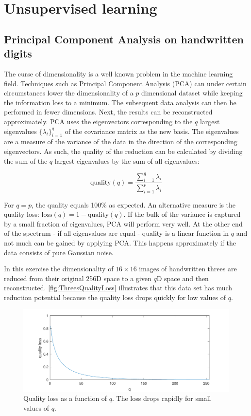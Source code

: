 \documentclass[a4, 10pt, twoside, twocolumn]{article}
\numberwithin{figure}{section}
\begin{document}
\section{Unsupervised learning}
\subsection{Principal Component Analysis on handwritten digits}
The curse of dimensionality is a well known problem in the machine learning field. Techniques such as Principal Component Analysis (PCA) can under certain circumstances lower the dimensionality of a $p$ dimensional dataset while keeping the information loss to a minimum. The subsequent data analysis can then be performed in fewer dimensions. Next, the results can be reconstructed approximately. PCA uses the eigenvectors corresponding to the $q$ largest eigenvalues $\{\lambda_i\}_{i=1}^q$ of the covariance matrix as the new basis. The eigenvalues are a measure of the variance of the data in the direction of the corresponding eigenvectors. As such, the quality of the reduction can be calculated by dividing the sum of the $q$ largest eigenvalues by the sum of all eigenvalues:

\begin{equation}
    \text{quality}(q) = \frac{\sum_{i=1}^q \lambda_i}{\sum_{i=1}^p \lambda_i}
\end{equation}

For $q=p$, the quality equals 100\% as expected. An alternative measure is the quality loss: $\text{loss}(q) = 1 - \text{quality}(q)$. If the bulk of the variance is captured by a small fraction of eigenvalues, PCA will perform very well. At the other end of the spectrum - if all eigenvalues are equal - quality is a linear function in $q$ and not much can be gained by applying PCA. This happens approximately if the data consists of pure Gaussian noise.

In this exercise the dimensionality of $16 \times 16$ images of handwritten threes are reduced from their original 256D space to a given $q$D space and then reconstructed. \autoref{fig:ThreesQualityLoss} illustrates that this data set has much reduction potential because the quality loss drops quickly for low values of $q$.

\begin{figure}[ht]
    \includegraphics[width=\linewidth]{img/ThreesQualityLoss.pdf}
    \caption{Quality loss as a function of $q$. The loss drops rapidly for small values of $q$.}
    \label{fig:ThreesQualityLoss}
\end{figure}
\end{document}
